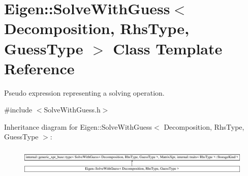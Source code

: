\hypertarget{class_eigen_1_1_solve_with_guess}{}\section{Eigen\+::Solve\+With\+Guess$<$ Decomposition, Rhs\+Type, Guess\+Type $>$ Class Template Reference}
\label{class_eigen_1_1_solve_with_guess}


Pseudo expression representing a solving operation.  




{\ttfamily \#include $<$Solve\+With\+Guess.\+h$>$}

Inheritance diagram for Eigen\+::Solve\+With\+Guess$<$ Decomposition, Rhs\+Type, Guess\+Type $>$\+:\begin{figure}[H]
\begin{center}
\leavevmode
\includegraphics[height=1.320755cm]{class_eigen_1_1_solve_with_guess}
\end{center}
\end{figure}

